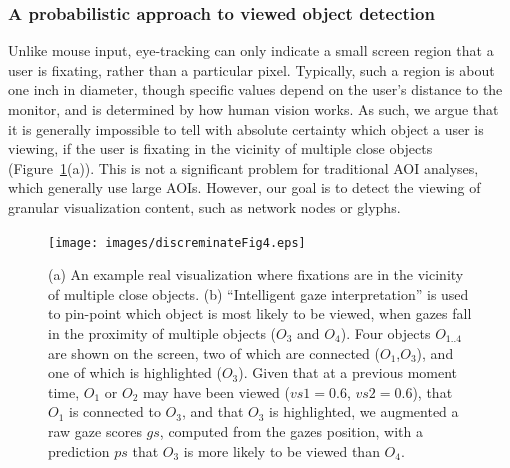 \subsubsection{A probabilistic approach to viewed object detection}\label{sec:ProbabilisticObjectDetection}
Unlike mouse input, eye-tracking can only indicate a small screen region that a user is fixating, rather than a particular pixel. Typically, such a region is about one inch in diameter, though specific values depend on the user's distance to the monitor, and is determined by how human vision works. As such, we argue that it is generally impossible to tell with absolute certainty which object a user is viewing, if the user is fixating in the vicinity of multiple close objects (Figure~\ref{fig:discreminateFig4}(a)). This is not a significant problem for traditional AOI analyses, which generally use large AOIs. However, our goal is to detect the viewing of granular visualization content, such as network nodes or glyphs. 

\begin{figure}[htb]
  \centering
  \texttt{[image: images/discreminateFig4.eps]}
  \caption{(a) An example real visualization where fixations are in the vicinity of multiple close objects. (b) ``Intelligent gaze interpretation'' is used to pin-point which object is most likely to be viewed, when gazes fall in the proximity of multiple objects ($O_3$ and $O_4$). Four objects $O_{1..4}$ are shown on the screen, two of which are connected ($O_1$,$O_3$), and one of which is highlighted ($O_3$). Given that at a previous moment time, $O_1$ or $O_2$ may have been viewed ($vs1 = 0.6$, $vs2=0.6$), that $O_1$ is connected to $O_3$, and that $O_3$ is highlighted, we augmented a raw gaze scores $gs$, computed from the gazes position, with  a prediction $ps$ that $O_3$ is more likely to be viewed than $O_4$.}
	\label{fig:discreminateFig4}
\end{figure}


